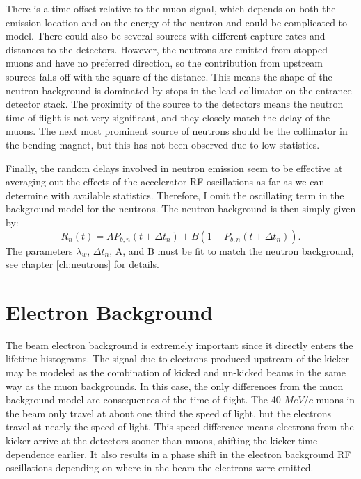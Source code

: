 There is a time offset relative to the muon signal, which depends on both the emission location and on the energy of the neutron and could be complicated to model.
There could also be several sources with different capture rates and distances to the detectors.
However, the neutrons are emitted from stopped muons and have no preferred direction, so the contribution from upstream sources falls off with the square of the distance.
This means the shape of the neutron background is dominated by stops in the lead collimator on the entrance detector stack.
The proximity of the source to the detectors means the neutron time of flight is not very significant, and they closely match the delay of the muons.
The next most prominent source of neutrons should be the collimator in the bending magnet, but this has not been observed due to low statistics.

Finally, the random delays involved in neutron emission seem to be effective at averaging out the effects of the accelerator RF oscillations as far as we can determine with available statistics.
Therefore, I omit the oscillating term in the background model for the neutrons.  
The neutron background is then simply given by:
\begin{equation}
R_n(t) = A P_{b,n}(t+\Delta t_n) + B (1-P_{b,n}(t+\Delta t_n)).
\label{eq:neutron}
\end{equation}
The parameters $\lambda_w$, $\Delta t_n$, A, and B must be fit to match the neutron background, see chapter \ref{ch:neutrons} for details.

\section{Electron Background}

The beam electron background is extremely important since it directly enters the lifetime histograms.  
The signal due to electrons produced upstream of the kicker may be modeled as the combination of kicked and un-kicked beams in the same way as the muon backgrounds.
In this case, the only differences from the muon background model are consequences of the time of flight.
The 40 $MeV/c$ muons in the beam only travel at about one third the speed of light, but the electrons travel at nearly the speed of light.
This speed difference means electrons from the kicker arrive at the detectors sooner than muons, shifting the kicker time dependence earlier.
It also results in a phase shift in the electron background RF oscillations depending on where in the beam the electrons were emitted.

